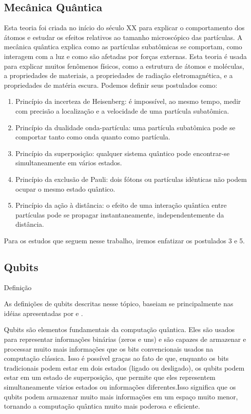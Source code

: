 \documentclass[11pt,oneside,brazil,hidelinks,article,sumario=tradicional,a4paper]{abntex2}
\begin{document}
\subsection{Mecânica Quântica}\label{Mecanicaquantica}

Esta teoria foi criada no início do século XX para explicar o comportamento dos átomos e estudar os efeitos relativos ao tamanho microscópico das partículas. A mecânica quântica explica como as partículas subatômicas se comportam, como interagem com a luz e como são afetadas por forças externas. Esta teoria é usada para explicar muitos fenômenos físicos, como a estrutura de átomos e moléculas, a propriedades de materiais, a propriedades de radiação eletromagnética, e a propriedades de matéria escura.
Podemos definir seus postulados como:
\begin{enumerate}
\item Princípio da incerteza de Heisenberg: é impossível, ao mesmo tempo, medir com precisão a localização e a velocidade de uma partícula subatômica.

\item Princípio da dualidade onda-partícula: uma partícula subatômica pode se comportar tanto como onda quanto como partícula.

\item Princípio da superposição: qualquer sistema quântico pode encontrar-se simultaneamente em vários estados.

\item Princípio da exclusão de Pauli: dois fótons ou partículas idênticas não podem ocupar o mesmo estado quântico.

\item Princípio da ação à distância: o efeito de uma interação quântica entre partículas pode se propagar instantaneamente, independentemente da distância.
\end{enumerate}

Para os estudos que seguem nesse trabalho, iremos enfatizar os postulados 3 e 5.


\subsection{Qubits}
Definição

As definições de qubits descritas nesse tópico, baseiam se principalmente nas idéias apresentadas por \textcite{chuang} e \textcite{CompInfoQuantica}.

Qubits são elementos fundamentais da computação quântica. Eles são usados para representar informações binárias (zeros e uns) e são capazes de armazenar e processar muito mais informações que os bits convencionais usados na computação clássica. Isso é possível graças ao fato de que, enquanto os bits tradicionais podem estar em dois estados (ligado ou desligado), os qubits podem estar em um estado de superposição, que permite que eles representem simultaneamente vários estados ou informações diferentes.Isso significa que os qubits podem armazenar muito mais informações em um espaço muito menor, tornando a computação quântica muito mais poderosa e eficiente.
\end{document}
